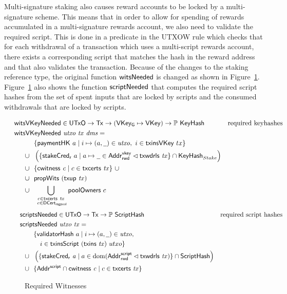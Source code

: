 \documentclass[11pt,a4paper,dvipsnames,twosided]{article}
\newcommand{\Tx}{\type{Tx}}
\newcommand{\UTxO}{\type{UTxO}}
\newcommand{\DCertRegPool}{\type{DCert_{regpool}}}
\newcommand{\AddrRWDVKey}{\type{Addr_{rwd}^{vkey}}}
\newcommand{\AddrRWDScr}{\type{Addr_{rwd}^{script}}}
\newcommand{\AddrScr}{\type{Addr^{script}}}
\newcommand{\HashScr}{\type{ScriptHash}}
\newcommand{\VKey}{\type{VKey}}
\newcommand{\VKeyGen}{\type{VKey_G}}
\newcommand{\KeyHash}{\type{KeyHash}}
\newcommand{\txcerts}[1]{\fun{txcerts}~ \var{#1}}
\newcommand{\cwitness}[1]{\fun{cwitness}~ \var{#1}}
\newcommand{\txwdrls}[1]{\fun{txwdrls}~ \var{#1}}
\newcommand{\wcard}[0]{\underline{\phantom{a}}}
\theoremstyle{definition}
\begin{document}
Multi-signature staking also causes reward accounts to be locked by a multi-signature
scheme. This means that in order to allow for spending of rewards accumulated in
a multi-signature rewards account, we also need to validate the required
script. This is done in a predicate in the UTXOW rule which checks that for each
withdrawal of a transaction which uses a multi-script rewards account, there
exists a corresponding script that matches the hash in the reward address and that also
validates the transaction. Because of the changes to the staking reference type,
the original function $\mathsf{witsNeeded}$ is changed as shown in
Figure~\ref{fig:functions-witnesses}. Figure~\ref{fig:functions-witnesses} also shows the function
$\mathsf{scriptNeeded}$ that computes the required script hashes from the set of
spent inputs that are locked by scripts and the consumed withdrawals that are locked by scripts.

\begin{figure}[htb]
  \begin{align*}
    & \hspace{-0.8cm}\fun{witsVKeyNeeded} \in \UTxO \to \Tx \to (\VKeyGen\mapsto\VKey) \to
      \powerset{\KeyHash}
    & \text{required keyhashes} \\
    &  \hspace{-0.8cm}\fun{witsVKeyNeeded}~\var{utxo}~\var{tx}~\var{dms} = \\
    & ~~\{ \fun{paymentHK}~a \mid i \mapsto (a, \wcard) \in \var{utxo},~i\in\fun{txinsVKey}~{tx} \} \\
    \cup & ~~
           \left(\{\fun{stakeCred_r}~a\mid a\mapsto \wcard \in \AddrRWDVKey
      \restrictdom \txwdrls{tx}\} \cap \KeyHash_{Stake}  \right)\\
    \cup & ~~\{\cwitness{c} \mid c \in \txcerts{tx}\}~\cup \\
    \cup & ~~\fun{propWits}~(\fun{txup}~\var{tx}) \\
    \cup & ~~\bigcup_{\substack{c \in \txcerts{tx} \\ ~c \in\DCertRegPool}} \fun{poolOwners}~{c}
  \end{align*}
  \begin{align*}
    & \hspace{-0.5cm}\fun{scriptsNeeded} \in \UTxO \to \Tx \to
      \powerset{\HashScr}
    & \text{required script hashes} \\
    &  \hspace{-0.5cm}\fun{scriptsNeeded}~\var{utxo}~\var{tx} = \\
    & ~~\{ \fun{validatorHash}~a \mid i \mapsto (a, \wcard) \in \var{utxo},\\
    & ~~~~~i\in\fun{txinsScript}~{(\fun{txins~\var{tx}})}~{utxo}\} \\
    \cup & ~~\left(\{ \fun{stakeCred_{r}}~\var{a} \mid a \in \dom (\AddrRWDScr
           \restrictdom \fun{txwdrls}~\var{tx}) \} \cap \HashScr\right) \\
    \cup & ~~\{\AddrScr \cap \fun{cwitness}~\var{c} \mid c \in \fun{txcerts}~\var{tx}\}
  \end{align*}
  \caption{Required Witnesses}
  \label{fig:functions-witnesses}
\end{figure}
\end{document}
